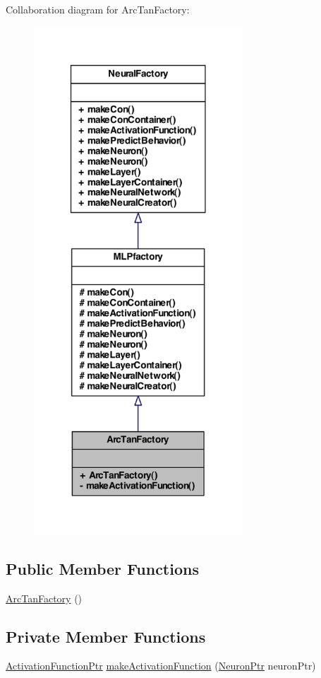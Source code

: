 Collaboration diagram for ArcTanFactory:\nopagebreak
\begin{figure}[H]
\begin{center}
\leavevmode
\includegraphics[width=222pt]{class_arc_tan_factory__coll__graph}
\end{center}
\end{figure}
\subsection*{Public Member Functions}
\begin{DoxyCompactItemize}
\item 
\hyperlink{class_arc_tan_factory_a2f3bb205588da069f2cc44dc90cf5633}{ArcTanFactory} ()
\end{DoxyCompactItemize}
\subsection*{Private Member Functions}
\begin{DoxyCompactItemize}
\item 
\hyperlink{_a_m_o_r_e_8h_a77602a0277a02e5769c3df0adc669b17}{ActivationFunctionPtr} \hyperlink{class_arc_tan_factory_ae07c1b383c55ee42732d97fb2215d7fb}{makeActivationFunction} (\hyperlink{_a_m_o_r_e_8h_ac1ea936c2c7728eb382278131652fef4}{NeuronPtr} neuronPtr)
\end{DoxyCompactItemize}


